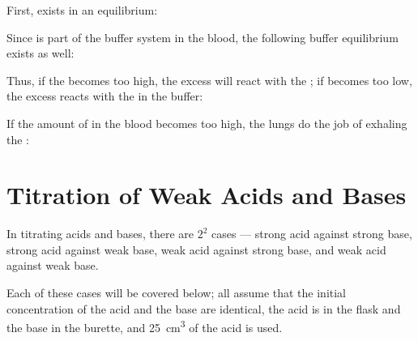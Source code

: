 			First,  exists in an equilibrium:


			Since  is part of the buffer system in the blood, the following buffer equilibrium exists as well:



			Thus, if the \pH{} becomes too high, the excess  will react with the ; if \pH{} becomes too low, the
			excess  reacts with the  in the buffer:



			If the amount of  in the blood becomes too high, the lungs do the job of exhaling the :







	\pagebreak
	\section{Titration of Weak Acids and Bases}

		In titrating acids and bases, there are $2^2$ cases --- strong acid against strong base, strong acid against weak base,
		weak acid against strong base, and weak acid against weak base.

		Each of these cases will be covered below; all assume that the initial concentration of the acid and the base are identical,
		the acid is in the flask and the base in the burette, and \SI{25}{\cubic\centi\metre} of the acid is used.

